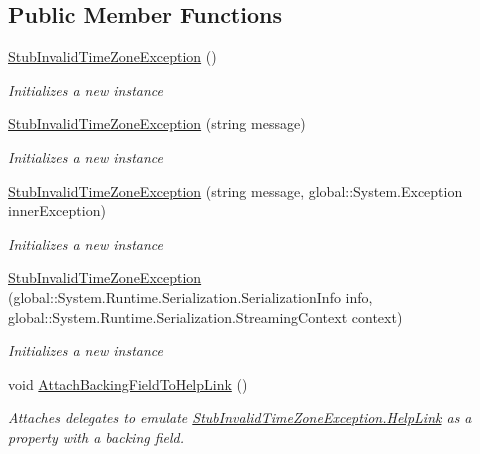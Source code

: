 \subsection*{Public Member Functions}
\begin{DoxyCompactItemize}
\item 
\hyperlink{class_system_1_1_fakes_1_1_stub_invalid_time_zone_exception_af23435fb3a4e06454c9fd2c9500b2abb}{Stub\-Invalid\-Time\-Zone\-Exception} ()
\begin{DoxyCompactList}\small\item\em Initializes a new instance\end{DoxyCompactList}\item 
\hyperlink{class_system_1_1_fakes_1_1_stub_invalid_time_zone_exception_a21d4f7980f72f406847d0afc6ecb9c8a}{Stub\-Invalid\-Time\-Zone\-Exception} (string message)
\begin{DoxyCompactList}\small\item\em Initializes a new instance\end{DoxyCompactList}\item 
\hyperlink{class_system_1_1_fakes_1_1_stub_invalid_time_zone_exception_ab451072a9303d2339106a2989f5033be}{Stub\-Invalid\-Time\-Zone\-Exception} (string message, global\-::\-System.\-Exception inner\-Exception)
\begin{DoxyCompactList}\small\item\em Initializes a new instance\end{DoxyCompactList}\item 
\hyperlink{class_system_1_1_fakes_1_1_stub_invalid_time_zone_exception_a5e9ac25b2e6877d35c46df937965dc75}{Stub\-Invalid\-Time\-Zone\-Exception} (global\-::\-System.\-Runtime.\-Serialization.\-Serialization\-Info info, global\-::\-System.\-Runtime.\-Serialization.\-Streaming\-Context context)
\begin{DoxyCompactList}\small\item\em Initializes a new instance\end{DoxyCompactList}\item 
void \hyperlink{class_system_1_1_fakes_1_1_stub_invalid_time_zone_exception_a8c3196cf3ecb5685a900207252d4ad14}{Attach\-Backing\-Field\-To\-Help\-Link} ()
\begin{DoxyCompactList}\small\item\em Attaches delegates to emulate \hyperlink{class_system_1_1_fakes_1_1_stub_invalid_time_zone_exception_a36448215bfd23451ae26c17ca0a390a2}{Stub\-Invalid\-Time\-Zone\-Exception.\-Help\-Link} as a property with a backing field.\end{DoxyCompactList}\item 

\end{DoxyCompactItemize}
